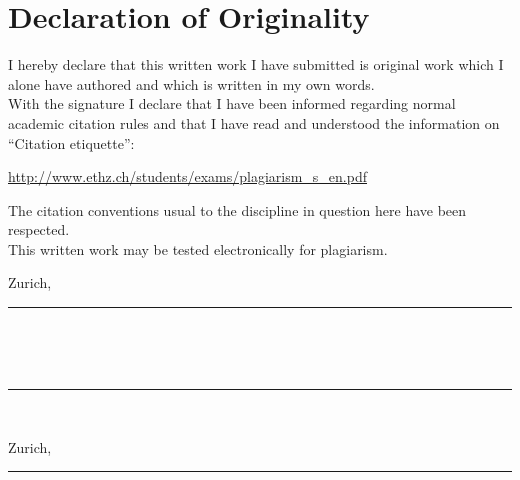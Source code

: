 \parskip 10pt

\chapter*{Declaration of Originality}

I hereby declare that this written work I have submitted is original work which
I alone have authored and which is written in my own words.
\\
With the signature I declare that I have been informed regarding normal academic citation rules
and that I have read and understood the information on ``Citation etiquette'':
\begin{center}
\url{http://www.ethz.ch/students/exams/plagiarism_s_en.pdf}
\end{center}
The citation conventions usual to the discipline in question here have been
respected.
\\
This written work may be tested electronically for plagiarism.

\vspace{3cm}

{
\noindent
{
\begin{minipage}[t]{6cm}
	Zurich, \thesisSubmission
\end{minipage}\hfill
\begin{minipage}[t]{6cm}
	\vskip 12pt
	\rule{6cm}{0.5pt} \\
	\parbox{6cm}{\hfill \thesisAuthorI \hfill\vbox{}}
\end{minipage}\hfill
}

\vspace{3cm}

\noindent
{
\begin{minipage}[t]{6cm}
	~
\end{minipage}\hfill
\begin{minipage}[t]{6cm}
	\vskip 12pt
	\rule{6cm}{0.5pt} \\
	\parbox{6cm}{\hfill \thesisAuthorII \hfill\vbox{}}
\end{minipage}\hfill
}
}
{
\noindent
{
\begin{minipage}[t]{6cm}
	Zurich, \thesisSubmission
\end{minipage}\hfill
\begin{minipage}[t]{6cm}
	\vskip 12pt
	\rule{6cm}{0.5pt} \\
	\parbox{6cm}{\hfill \thesisAuthor \hfill\vbox{}}
\end{minipage}\hfill
}
}

